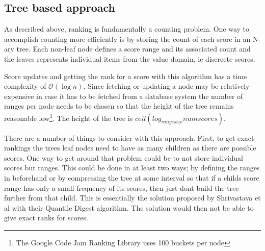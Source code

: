 \subsection{Tree based approach}

As described above, ranking is fundamentally a counting problem. One way to accomplish counting more efficiently is by storing the count of each score in an N-ary tree. Each non-leaf node defines a score range and its associated count and the leaves represents individual items from the value domain, ie discreete scores.

Score updates and getting the rank for a score with this algorithm has a time complexity of $\mathcal{O}(\log{} n)$. Since fetching or updating a node may be relatively expensive in case it has to be fetched from a database system the number of ranges per node needs to be chosen so that the height of the tree remains reasonable low\footnote{The Google Code Jam Ranking Library uses 100 buckets per node}. The height of the tree is $ceil(log_{rangesize}numscores)$.

There are a number of things to consider with this approach. First, to get exact rankings the trees leaf nodes need to have as many children as there are possible scores. One way to get around that problem could be to not store individual scores but ranges. This could be done in at least two ways; by defining the ranges in beforehand or by compressing the tree at some interval so that if a childs score range has only a small frequency of its scores, then just dont build the tree further from that child. This is essentially the solution proposed by Shrivastava et al\cite{quantile_digest} with their Quantile Digest algorithm. The solution would then not be able to give exact ranks for scores.

